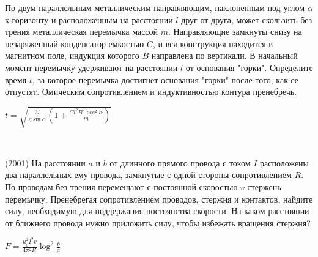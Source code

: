 \begin{ex}
По двум параллельным металлическим направляющим, наклоненным под углом $\alpha$ к горизонту и 
расположенным на расстоянии $l$ друг от друга, может скользить без трения металлическая перемычка массой $m$. 
Направляющие замкнуты снизу на незаряженный конденсатор емкостью $C$, и вся конструкция находится в магнитном поле, индукция которого $B$ направлена по вертикали. В начальный момент перемычку удерживают на расстоянии $l$ от основания "горки". 
Определите время $t$, за которое перемычка достигнет основания "горки"  после того, как ее отпустят. 
Омическим сопротивлением и индуктивностью контура пренебречь.
\begin{center}

\end{center}
\begin{ans}
$t=\sqrt{\frac{2l}{g \sin \alpha} \left( 1 + \frac{C l^2B^2 \cos^2 \alpha}{m} \right)}$
\end{ans}
\end{ex}

\begin{ex}
\hspace{0pt} \\
\begin{minipage}{.65\textwidth}
(2001) На расстоянии $a$ и $b$ от длинного прямого провода с током $I$ расположены два параллельных ему провода, 
замкнутые с одной стороны сопротивлением $R$. По проводам без трения перемещают с постоянной скоростью $v$ стержень-перемычку. 
Пренебрегая сопротивлением проводов, стержня и контактов, найдите силу, необходимую для поддержания постоянства скорости. 
На каком расстоянии от ближнего провода нужно приложить силу, чтобы избежать вращения стержня?
\end{minipage}
\begin{minipage}{.35\textwidth}
\centering

\end{minipage}
\begin{ans}
$F=\frac{\mu_0^2 I^2 v}{4 \pi^2 R} \log^2 \frac{b}{a}$
\end{ans}
\end{ex}

